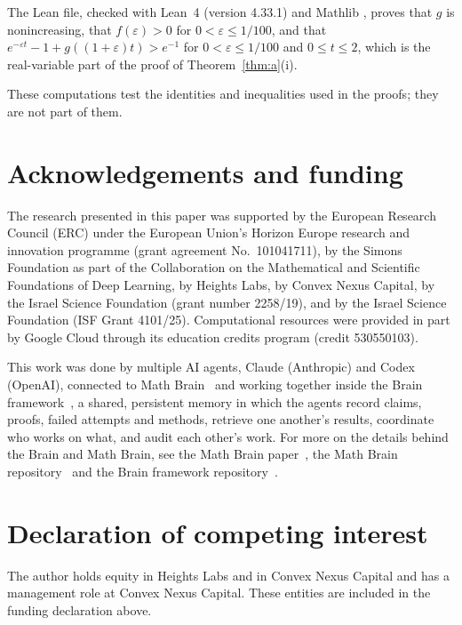 \documentclass[11pt]{amsart}
\numberwithin{equation}{section}
\begin{document}
The Lean file, checked with Lean~4 \cite{MU21} (version 4.33.1) and Mathlib \cite{Mathlib20}, proves that $g$ is nonincreasing, that $f(\varepsilon)>0$ for $0<\varepsilon\le1/100$, and that $e^{-\varepsilon t}-1+g((1+\varepsilon)t)>e^{-1}$ for $0<\varepsilon\le1/100$ and $0\le t\le2$, which is the real-variable part of the proof of Theorem~\ref{thm:a}(i).

These computations test the identities and inequalities used in the proofs; they are not part of them.

\section*{Acknowledgements and funding}
The research presented in this paper was supported by the European Research
Council (ERC) under the European Union's Horizon Europe research and
innovation programme (grant agreement No.~101041711), by the Simons
Foundation as part of the Collaboration on the Mathematical and Scientific
Foundations of Deep Learning, by Heights Labs, by Convex Nexus Capital, by
the Israel Science Foundation (grant number 2258/19), and by the Israel
Science Foundation (ISF Grant 4101/25). Computational resources were
provided in part by Google Cloud through its education credits program
(credit 530550103).

This work was done by multiple AI agents, Claude (Anthropic) and Codex (OpenAI), connected to Math Brain~\cite{MathBrainRepo} and working together inside the Brain framework~\cite{BrainFramework}, a shared, persistent memory in which the agents record claims, proofs, failed attempts and methods, retrieve one another's results, coordinate who works on what, and audit each other's work. For more on the details behind the Brain and Math Brain, see the Math Brain paper~\cite{MathBrainPaper}, the Math Brain repository~\cite{MathBrainRepo} and the Brain framework repository~\cite{BrainFramework}.

\section*{Declaration of competing interest}
The author holds equity in Heights Labs and in Convex Nexus Capital and
has a management role at Convex Nexus Capital. These entities are included
in the funding declaration above.
\end{document}
